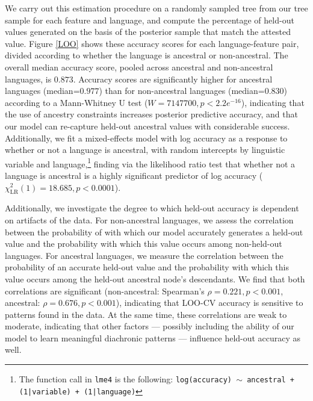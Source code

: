 \documentclass[12pt]{article}
\begin{document}
\begin{appendices}
We carry out this estimation procedure on a randomly sampled tree from our tree sample for each feature and language, and compute the percentage of held-out values generated on the basis of the posterior sample that match the attested value. Figure \ref{LOO} shows these accuracy scores for each language-feature pair, divided according to whether the language is ancestral or non-ancestral. 
The overall median accuracy score, pooled across ancestral and non-ancestral languages, is $0.873$. 
Accuracy scores are significantly higher for ancestral languages (median=$0.977$) than for non-ancestral languages (median=$0.830$) according to a Mann-Whitney U test ($W=7147700, p<2.2e^{-16}$), indicating that the use of ancestry constraints increases posterior predictive accuracy, and that our model can re-capture held-out ancestral values with considerable success. 
Additionally, we fit a mixed-effects model with log accuracy as a response to whether or not a language is ancestral, with random intercepts by linguistic variable and language,\footnote{The function call in {\tt lme4} \citep{Bates2015} is the following: {\tt log(accuracy) $\sim$ ancestral + (1|variable) + (1|language)}} 
finding via the likelihood ratio test that whether not a language is ancestral is a highly significant predictor of log accuracy ($\chi^2_{\text{LR}}(1) = 18.685, p < 0.0001$).

Additionally, we investigate the degree to which held-out accuracy is dependent on artifacts of the data. For non-ancestral languages, we assess the correlation between the probability of with which our model accurately generates a held-out value and the probability with which this value occurs among non-held-out languages. 
For ancestral languages, we measure the correlation between the probability of an accurate held-out value and the probability with which this value occurs among the held-out ancestral node's descendants. 
We find that both correlations are significant (non-ancestral: Spearman's $\rho=0.221,p<0.001$, ancestral: $\rho=0.676,p<0.001$), indicating that LOO-CV accuracy is sensitive to patterns found in the data. At the same time, these correlations are weak to moderate, indicating that other factors --- possibly including the ability of our model to learn meaningful diachronic patterns --- influence held-out accuracy as well. 



\end{appendices}
\end{document}
